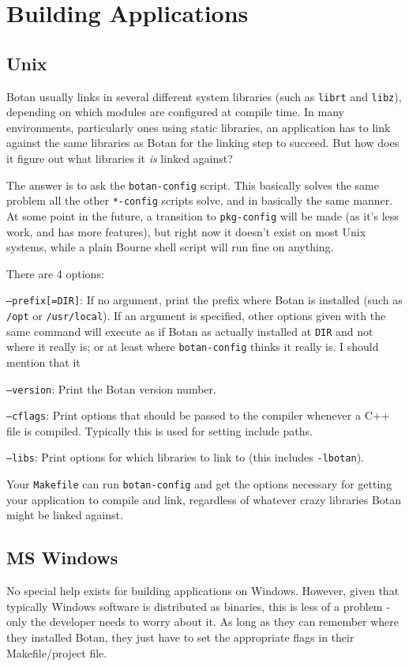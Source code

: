 \documentclass{article}
\newcommand{\filename}[1]{\texttt{#1}}
\begin{document}
\pagebreak

\section{Building Applications}

\subsection{Unix}

Botan usually links in several different system libraries (such as
\texttt{librt} and \texttt{libz}), depending on which modules are
configured at compile time. In many environments, particularly ones
using static libraries, an application has to link against the same
libraries as Botan for the linking step to succeed. But how does it
figure out what libraries it \emph{is} linked against?

The answer is to ask the \filename{botan-config} script. This
basically solves the same problem all the other \filename{*-config}
scripts solve, and in basically the same manner. At some point in the
future, a transition to \filename{pkg-config} will be made (as it's
less work, and has more features), but right now it doesn't exist on
most Unix systems, while a plain Bourne shell script will run fine on
anything.

There are 4 options:

\texttt{--prefix[=DIR]}: If no argument, print the prefix where Botan
is installed (such as \filename{/opt} or \filename{/usr/local}). If an
argument is specified, other options given with the same command will
execute as if Botan as actually installed at \filename{DIR} and not
where it really is; or at least where \filename{botan-config} thinks
it really is. I should mention that it

\texttt{--version}: Print the Botan version number.

\texttt{--cflags}: Print options that should be passed to the compiler
whenever a C++ file is compiled. Typically this is used for setting
include paths.

\texttt{--libs}: Print options for which libraries to link to (this includes
\texttt{-lbotan}).

Your \filename{Makefile} can run \filename{botan-config} and get the
options necessary for getting your application to compile and link,
regardless of whatever crazy libraries Botan might be linked against.

\subsection{MS Windows}

No special help exists for building applications on Windows. However,
given that typically Windows software is distributed as binaries, this
is less of a problem - only the developer needs to worry about it. As
long as they can remember where they installed Botan, they just have
to set the appropriate flags in their Makefile/project file.
\end{document}
